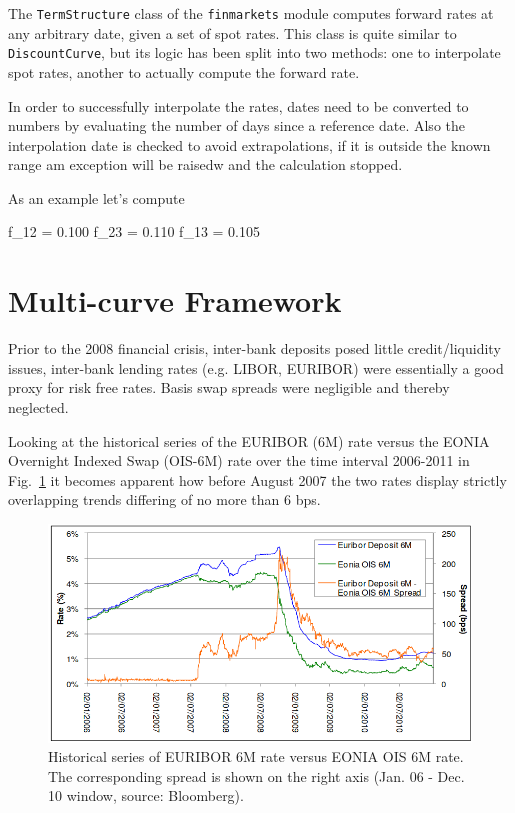\begin{finmarkets}
The \texttt{TermStructure} class of the \texttt{finmarkets} module computes forward rates at any arbitrary date, given a set of spot rates. This class is quite similar to \texttt{DiscountCurve}, but its logic has been split into two methods: one to interpolate spot rates, another to actually compute the forward rate.

In order to successfully interpolate the rates, dates need to be converted to numbers by evaluating the number of days since a reference date. Also the interpolation date is checked to avoid extrapolations, if it is outside the known range am exception will be raisedw and the calculation stopped.
\end{finmarkets}


As an example let's compute


\begin{ioutput}
f_12 = 0.100
f_23 = 0.110
f_13 = 0.105
\end{ioutput}

\section{Multi-curve Framework}
\label{sec:financial-crisis}


Prior to the 2008 financial crisis, inter-bank deposits posed little credit/liquidity issues, inter-bank lending rates (e.g. LIBOR, EURIBOR) were essentially a good proxy for risk free rates. Basis swap spreads were negligible and thereby neglected. 

Looking at the historical series of the EURIBOR (6M) rate versus the EONIA Overnight Indexed Swap (OIS-6M) rate over the time interval 2006-2011 in Fig.~\ref{fig:credit_crunch} it becomes apparent how before August 2007 the two rates display strictly overlapping trends differing of no more than 6 bps.

\begin{figure}[htb]
	\centering
	\includegraphics[width=0.9\linewidth]{figures/credit_crunch.png}
	\caption{Historical series of EURIBOR 6M rate versus EONIA OIS 6M rate. The corresponding spread 
		is shown on the right axis (Jan. 06 - Dec. 10 window, source: Bloomberg).}
	\label{fig:credit_crunch}
\end{figure}

